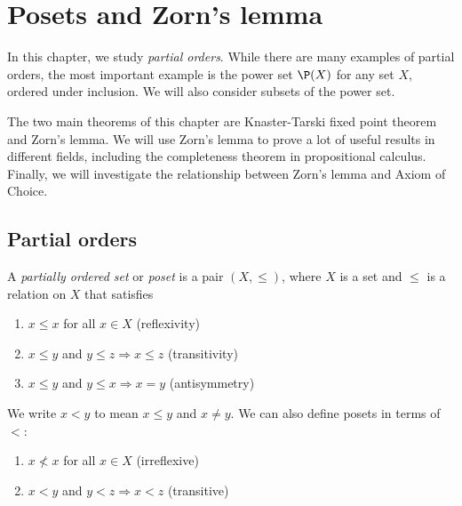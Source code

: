 \documentclass[a4paper]{article}
\begin{document}
\section{Posets and Zorn's lemma}
\label{sec:poset}
In this chapter, we study \emph{partial orders}. While there are many examples of partial orders, the most important example is the power set $\P(X)$ for any set $X$, ordered under inclusion. We will also consider subsets of the power set.

The two main theorems of this chapter are Knaster-Tarski fixed point theorem and Zorn's lemma. We will use Zorn's lemma to prove a lot of useful results in different fields, including the completeness theorem in propositional calculus. Finally, we will investigate the relationship between Zorn's lemma and Axiom of Choice.

\subsection{Partial orders}
\begin{defi}
  A \emph{partially ordered set} or \emph{poset} is a pair $(X, \leq)$, where $X$ is a set and $\leq$ is a relation on $X$ that satisfies
  \begin{enumerate}
    \item $x\leq x$ for all $x\in X$ \hfill (reflexivity)
    \item $x \leq y$ and $y \leq z \Rightarrow x \leq z$ \hfill (transitivity)
    \item $x \leq y$ and $y \leq x \Rightarrow x = y$ \hfill (antisymmetry)
  \end{enumerate}
  We write $x < y$ to mean $ x\leq y$ and $x\not= y$. We can also define posets in terms of~$<$:
  \begin{enumerate}
    \item $x \not< x$ for all $x\in X$ \hfill (irreflexive)
    \item $x < y$ and $y < z\Rightarrow  x < z$ \hfill (transitive)
  \end{enumerate}
\end{defi}
\end{document}
